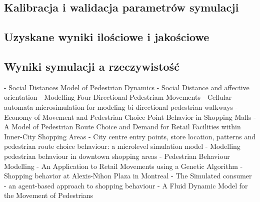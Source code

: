 \documentclass[a4paper, 12pt]{article}
\begin{document}

        \subsection{Kalibracja i walidacja parametrów symulacji}
        \label{sec:p}


        \subsection{Uzyskane wyniki ilościowe i jakościowe}
        \label{sec:results}


        \subsection{Wyniki symulacji a rzeczywistość}
        \label{sec:sim-vs-reality}


\newpage
    \begin{thebibliography}{9}
        \label{sec:refs}

         - Social Distances Model of Pedestrian Dynamics
         - Social Distance and affective orientation
         - Modelling Four Directional Pedestriam Movements
         - Cellular automata microsimulation for modeling bi-directional pedestrian walkways
         - Economy of Movement and Pedestrian Choice Point Behavior in Shopping Malls
         - A Model of Pedestrian Route Choice and Demand for Retail Facilities within Inner-City Shopping Areas
         - City centre entry points, store location, patterns and pedestrian route choice behaviour: a microlevel simulation model
         - Modelling pedestrian behaviour in downtown shopping areas
         - Pedestrian Behaviour Modelling - An Application to Retail Movements using a Genetic Algorithm
         - Shopping behavior at Alexis-Nihon Plaza in Montreal
         - The Simulated consumer - an agent-based approach to shopping behaviour
         - A Fluid Dynamic Model for the Movement of Pedestrians
    \end{thebibliography}
\end{document}
